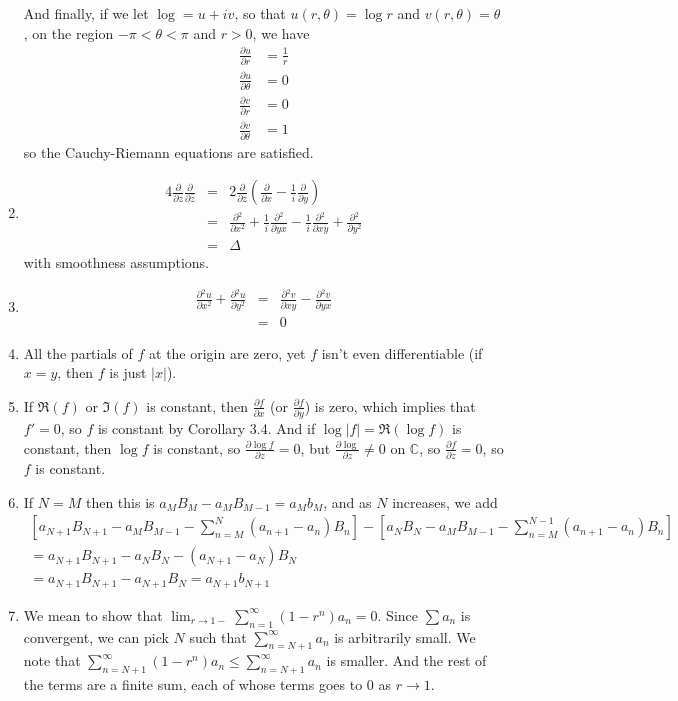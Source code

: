 \documentclass{article}
\newcommand\CC{\mathbb C}
\newcommand\conj{\overline}
\newcommand\ptl[2]{\frac{\partial{#1}}{\partial{#2}}}
\begin{document}
\begin{enumerate}
  And finally, if we let $\log = u+iv$, so that $u(r,\theta) = \log r$
  and $v(r,\theta) = \theta$, on the region $-\pi<\theta<\pi$ and
  $r>0$, we have
  \begin{align}
    \ptl ur &= \frac1r \\
    \ptl u\theta &= 0 \\
    \ptl vr &= 0 \\
    \ptl v\theta &= 1
  \end{align}
  so the Cauchy-Riemann equations are satisfied.
\item
  \begin{eqnarray*}
    4\ptl{}z\ptl{}{\conj z} &=&
    2\ptl{}z\left(\ptl{}x-\frac1i\ptl{}y\right) \\
    &=& \ptl{^2}{x^2} + \frac1i\ptl{^2}{yx} - \frac1i\ptl{^2}{xy} +
    \ptl{^2}{y^2} \\ &=& \Delta
  \end{eqnarray*}
  with smoothness assumptions.
\item
  \begin{eqnarray*}
    \ptl{^2u}{x^2}+\ptl{^2u}{y^2} &=& \ptl{^2v}{xy} - \ptl{^2v}{yx}
    \\&=& 0
  \end{eqnarray*}
\item All the partials of $f$ at the origin are zero, yet $f$ isn't
  even differentiable (if $x=y$, then $f$ is just $|x|$).
\item If $\Re(f)$ or $\Im(f)$ is constant, then $\ptl fx$ (or $\ptl
  fy$) is zero, which implies that $f'=0$, so $f$ is constant by
  Corollary 3.4. And if $\log|f| = \Re(\log f)$ is constant, then
  $\log f$ is constant, so $\ptl{\log f}z = 0$, but $\ptl\log z \neq
  0$ on $\CC$, so $\ptl fz = 0$, so $f$ is constant.
\item If $N=M$ then this is $a_MB_M - a_MB_{M-1} = a_Mb_M$, and as $N$
  increases, we add
  \begin{eqnarray*}
    \left[
      a_{N+1}B_{N+1} - a_MB_{M-1} -\sum_{n=M}^N(a_{n+1}-a_n)B_n
    \right] - \left[
      a_NB_N - a_MB_{M-1} - \sum_{n=M}^{N-1}(a_{n+1}-a_n)B_n \right]
    \\
    = a_{N+1}B_{N+1} - a_NB_N - (a_{N+1} - a_N)B_N \\
    = a_{N+1}B_{N+1} - a_{N+1}B_N = a_{N+1}b_{N+1}
  \end{eqnarray*}
\item We mean to show that $\lim_{r \to 1-}\sum_{n=1}^\infty
  (1-r^n)a_n = 0$. Since $\sum a_n$ is convergent, we can pick $N$
  such that $\sum_{n=N+1}^\infty a_n$ is arbitrarily small. We note
  that $\sum_{n=N+1}^\infty (1-r^n)a_n \leq \sum_{n=N+1}^\infty a_n$
  is smaller. And the rest of the terms are a finite sum, each of
  whose terms goes to 0 as $r \to 1$.

\end{enumerate}
\end{document}
